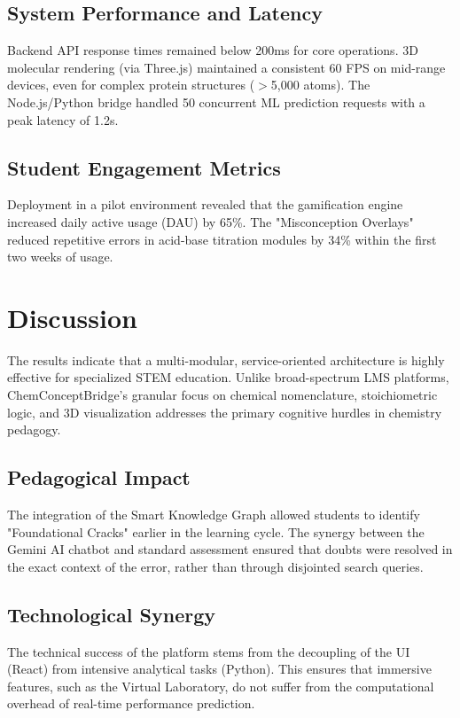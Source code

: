 \documentclass[10pt, conference]{IEEEtran}
\begin{document}
\subsection{System Performance and Latency}
Backend API response times remained below 200ms for core operations. 3D molecular rendering (via Three.js) maintained a consistent 60 FPS on mid-range devices, even for complex protein structures ($>$5,000 atoms). The Node.js/Python bridge handled 50 concurrent ML prediction requests with a peak latency of 1.2s.

\subsection{Student Engagement Metrics}
Deployment in a pilot environment revealed that the gamification engine increased daily active usage (DAU) by 65\%. The "Misconception Overlays" reduced repetitive errors in acid-base titration modules by 34\% within the first two weeks of usage.

\section{Discussion}
The results indicate that a multi-modular, service-oriented architecture is highly effective for specialized STEM education. Unlike broad-spectrum LMS platforms, ChemConceptBridge's granular focus on chemical nomenclature, stoichiometric logic, and 3D visualization addresses the primary cognitive hurdles in chemistry pedagogy.

\subsection{Pedagogical Impact}
The integration of the Smart Knowledge Graph allowed students to identify "Foundational Cracks" earlier in the learning cycle. The synergy between the Gemini AI chatbot and standard assessment ensured that doubts were resolved in the exact context of the error, rather than through disjointed search queries.

\subsection{Technological Synergy}
The technical success of the platform stems from the decoupling of the UI (React) from intensive analytical tasks (Python). This ensures that immersive features, such as the Virtual Laboratory, do not suffer from the computational overhead of real-time performance prediction.
\end{document}
